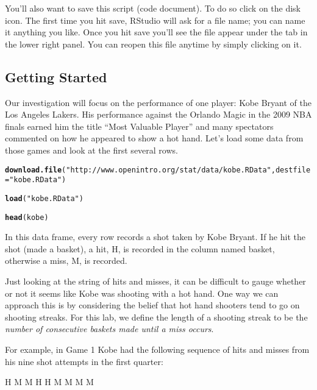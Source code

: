 \documentclass{article}\usepackage[]{graphicx}\usepackage[]{color}
\makeatletter
\newcommand{\hlstr}[1]{\textcolor[rgb]{0.192,0.494,0.8}{#1}}%
\newcommand{\hlstd}[1]{\textcolor[rgb]{0.345,0.345,0.345}{#1}}%
\newcommand{\hlkwc}[1]{\textcolor[rgb]{0.333,0.667,0.333}{#1}}%
\newcommand{\hlkwd}[1]{\textcolor[rgb]{0.737,0.353,0.396}{\textbf{#1}}}%
\newenvironment{kframe}{%
 \def\at@end@of@kframe{}%
 \ifinner\ifhmode%
  \def\at@end@of@kframe{\end{minipage}}%
  \begin{minipage}{\columnwidth}%
 \fi\fi%
 \def\FrameCommand##1{\hskip\@totalleftmargin \hskip-\fboxsep
 \colorbox{shadecolor}{##1}\hskip-\fboxsep
     \hskip-\linewidth \hskip-\@totalleftmargin \hskip\columnwidth}%
 \MakeFramed {\advance\hsize-\width
   \@totalleftmargin\z@ \linewidth\hsize
   \@setminipage}}%
 {\par\unskip\endMakeFramed%
 \at@end@of@kframe}
\newenvironment{knitrout}{}{} %
\makeatother
\begin{document}
You'll also want to save this script (code document). To do so click on the disk icon. The first time you hit save, RStudio will ask for a file name; you can name it anything you like. Once you hit save you'll see the file appear under the  tab in the lower right panel. You can reopen this file anytime by simply clicking on it.

%

\subsection*{Getting Started}
Our investigation will focus on the performance of one player: Kobe Bryant of the Los Angeles Lakers. His performance against the Orlando Magic in the 2009 NBA finals earned him the title ``Most Valuable Player'' and many spectators commented on how he appeared to show a hot hand. Let's load some data from those games and look at the first several rows.


\begin{knitrout}
\color{fgcolor}\begin{kframe}
\begin{alltt}
\hlkwd{download.file}\hlstd{(}\hlstr{"http://www.openintro.org/stat/data/kobe.RData"}\hlstd{,} \hlkwc{destfile} \hlstd{=} \hlstr{"kobe.RData"}\hlstd{)}

\hlkwd{load}\hlstd{(}\hlstr{"kobe.RData"}\hlstd{)}

\hlkwd{head}\hlstd{(kobe)}
\end{alltt}
\end{kframe}
\end{knitrout}


In this data frame, every row records a shot taken by Kobe Bryant. If he hit the shot (made a basket), a hit, \hlstr{H}, is recorded in the column named \hlstd{basket}, otherwise a miss, \hlstr{M}, is recorded.

Just looking at the string of hits and misses, it can be difficult to gauge whether or not it seems like Kobe was shooting with a hot hand. One way we can approach this is by considering the belief that hot hand shooters tend to go on shooting streaks. For this lab, we define the length of a shooting streak to be the \emph{number of consecutive baskets made until a miss occurs}.

For example, in Game 1 Kobe had the following sequence of hits and misses from his nine shot attempts in the first quarter:

\begin{center}
 H \quad M \quad \textbar \quad M \quad \textbar \quad H \quad H \quad M \quad \textbar \quad M \quad \textbar \quad M \quad \textbar \quad M
\end{center}
\end{document}
